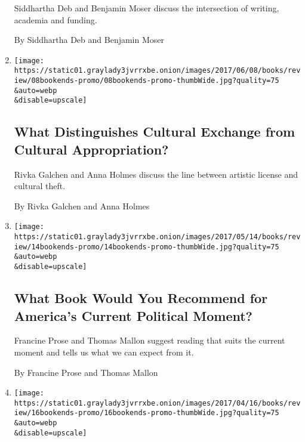 \begin{enumerate}
  Siddhartha Deb and Benjamin Moser discuss the intersection of writing,
  academia and funding.

  By Siddhartha Deb and Benjamin Moser
\item
  \href{/2017/06/08/books/review/bookends-cultural-appropriation.html}{}

  \texttt{[image: https://static01.graylady3jvrrxbe.onion/images/2017/06/08/books/review/08bookends-promo/08bookends-promo-thumbWide.jpg?quality=75\\\&auto=webp\\\&disable=upscale]}

  \hypertarget{what-distinguishes-cultural-exchange-from-cultural-appropriation}{%
  \subsection{What Distinguishes Cultural Exchange from Cultural
  Appropriation?}\label{what-distinguishes-cultural-exchange-from-cultural-appropriation}}

  Rivka Galchen and Anna Holmes discuss the line between artistic
  license and cultural theft.

  By Rivka Galchen and Anna Holmes
\item
  \href{/2017/05/11/books/review/what-book-would-you-recommend-for-americas-current-political-moment.html}{}

  \texttt{[image: https://static01.graylady3jvrrxbe.onion/images/2017/05/14/books/review/14bookends-promo/14bookends-promo-thumbWide.jpg?quality=75\\\&auto=webp\\\&disable=upscale]}

  \hypertarget{what-book-would-you-recommend-for-americas-current-political-moment}{%
  \subsection{What Book Would You Recommend for America's Current
  Political
  Moment?}\label{what-book-would-you-recommend-for-americas-current-political-moment}}

  Francine Prose and Thomas Mallon suggest reading that suits the
  current moment and tells us what we can expect from it.

  By Francine Prose and Thomas Mallon
\item
  \href{/2017/04/13/books/review/which-force-is-more-harmful-to-the-arts-elitism-or-populism.html}{}

  \texttt{[image: https://static01.graylady3jvrrxbe.onion/images/2017/04/16/books/review/16bookends-promo/16bookends-promo-thumbWide.jpg?quality=75\\\&auto=webp\\\&disable=upscale]}


\end{enumerate}
